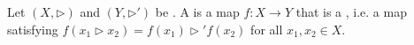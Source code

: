 \begin{definition} \label{definition:homomorphism_of_quandles}
Let $(X, \rhd)$ and $(Y, \rhd')$ be . A  is a map $f: X \to Y$ that is a , i.e. a map satisfying $f(x_1 \rhd x_2) = f(x_1) \rhd' f(x_2)$ for all $x_1, x_2 \in X$.
\end{definition}